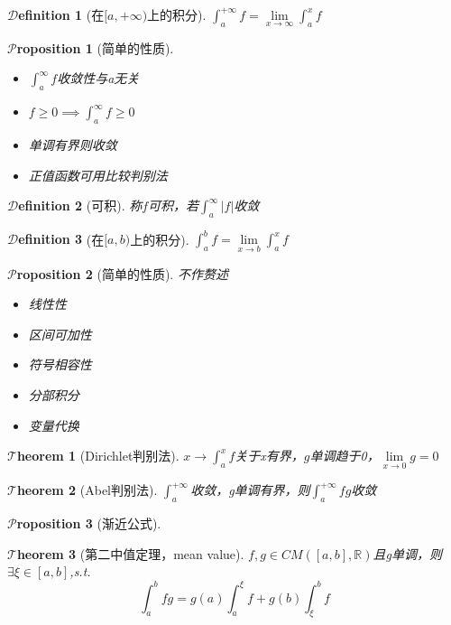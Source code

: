 \documentclass[hyperfer,UTF8,a4paper,12pt]{article}
\theoremstyle{plain}
\newtheorem{Thm}{$\mathcal{T}$heorem}
\newtheorem*{Prop}{$\mathcal{P}$roposition}
\newtheorem{Def}{{$\mathcal{D}$efinition}}[section]
\begin{document}
\begin{Def}[在$ [a,+\infty) $上的积分]
	$ \int_{a}^{+\infty}f=\lim\limits_{x\to\infty}\int_{a}^{x}f	 $
\end{Def}

\begin{Prop}[简单的性质]
	\hspace*{\fill}
	\begin{itemize}
		\item $ \int_{a}^{\infty}f $收敛性与a无关
		\item $ f\geqslant 0 \implies \int_{a}^{\infty}f\geqslant0$
		\item 单调有界则收敛
		\item 正值函数可用比较判别法
	\end{itemize}
\end{Prop}

\begin{Def}[可积]
	称$ f $可积，若$ \int_{a}^{\infty}|f| $收敛
\end{Def}

\begin{Def}[在$ [a,b) $上的积分]
	$ \int_{a}^{b}f= \lim\limits_{x\to b}\int_{a}^{x}f $
\end{Def}
\begin{Prop}[简单的性质]
	不作赘述
	\hspace*{\fill}
	\begin{itemize}
		\item 线性性
		\item 区间可加性
		\item 符号相容性
		\item 分部积分
		\item 变量代换
	\end{itemize}
\end{Prop}

\begin{Thm}[Dirichlet判别法]
	$ x\to\int_{a}^{x}f $关于x有界，$ g $单调趋于0，$ \lim\limits_{x\to 0}g=0 $
	
\end{Thm}

\begin{Thm}[Abel判别法]
	$ \int_{a}^{+\infty} $收敛，g单调有界，则$ \int_{a}^{+\infty}fg $收敛
\end{Thm}

\begin{Prop}[渐近公式]
	
\end{Prop}

\begin{Thm}[第二中值定理，mean value]
	$ f,g \in CM([a,b],\mathbb{R}) $且g单调，则$ \exists\xi\in[a,b] $,s.t.\[ \int_{a}^b fg=g(a)\int_{a}^{\xi}f+g(b)\int_{\xi}^{b}f  \]
\end{Thm}
\end{document}
